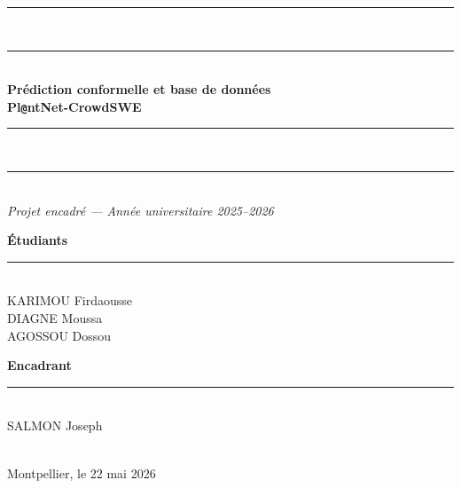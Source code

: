 \documentclass[12pt,a4paper]{article}
\begin{document}
\begin{titlepage}
  {\color{univ-red}\rule{\textwidth}{2pt}}\\[2pt]
  {\color{univ-red!35}\rule{\textwidth}{0.6pt}}\\[0.55cm]

  {\fontsize{22}{28}\selectfont\textbf{\color{univ-red}
    Prédiction conformelle et base de données\\[0.25cm]
    Pl\texttt{@}ntNet-CrowdSWE%
  }}\\[0.55cm]

  {\color{univ-red!35}\rule{\textwidth}{0.6pt}}\\[2pt]
  {\color{univ-red}\rule{\textwidth}{2pt}}\\[0.55cm]

  {\color{gray!65}\itshape\large Projet encadré — Année universitaire 2025--2026}\\[0.7cm]

  \begin{tcolorbox}[
    colback=white,
    colframe=vert-moyen!55,
    arc=5pt,
    boxrule=0.7pt,
    left=1.0cm, right=1.0cm, top=0.5cm, bottom=0.5cm,
    width=\textwidth
  ]
  \begin{minipage}[t]{0.45\textwidth}
    \textbf{\color{vert-fonce}Étudiants}\\[0.15cm]
    \rule{\linewidth}{0.4pt}\\[0.2cm]
    KARIMOU Firdaousse\\[0.28cm]
    DIAGNE Moussa\\[0.28cm]
    AGOSSOU Dossou
  \end{minipage}%
  \hfill
  \begin{minipage}[t]{0.45\textwidth}
    \textbf{\color{vert-fonce}Encadrant}\\[0.15cm]
    \rule{\linewidth}{0.4pt}\\[0.2cm]
    SALMON Joseph\\[0.28cm]
    \\[0.28cm]
   
  \end{minipage}
  \end{tcolorbox}

  \vspace{0.6cm}
  {\large Montpellier, le 22 mai 2026}

\end{titlepage}


\tableofcontents
\newpage
{}

 
\end{document}
